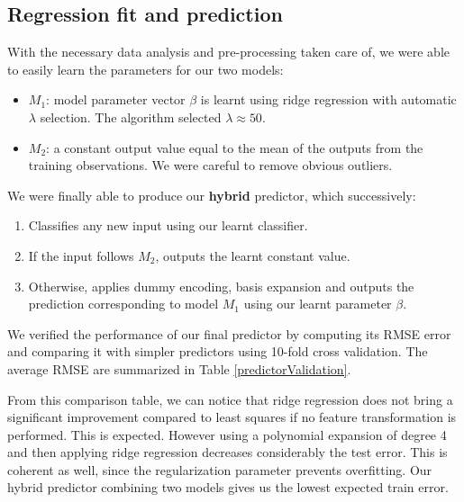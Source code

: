 \documentclass{article} %
\begin{document}
  \subsection{Regression fit and prediction}
  With the necessary data analysis and pre-processing taken care of, we were able to easily learn the parameters for our two models:
  \begin{itemize}
    \item $M_1$: model parameter vector $\beta$ is learnt using ridge regression with automatic $\lambda$ selection. The algorithm selected $\lambda \approx 50$.
    \item $M_2$: a constant output value equal to the mean of the outputs from the training observations. We were careful to remove obvious outliers.
  \end{itemize}

  We were finally able to produce our \textbf{hybrid} predictor, which successively:
  \begin{enumerate}
    \item Classifies any new input using our learnt classifier.
    \item If the input follows $M_2$, outputs the learnt constant value.
    \item Otherwise, applies dummy encoding, basis expansion and outputs the prediction corresponding to model $M_1$ using our learnt parameter $\beta$.
  \end{enumerate}

  We verified the performance of our final predictor by computing its RMSE error and comparing it with simpler predictors using 10-fold cross validation. The average RMSE are summarized in Table \ref{predictorValidation}.

  From this comparison table, we can notice that ridge regression does not bring a significant improvement compared to least squares if no feature transformation is performed. This is expected. However using a polynomial expansion of degree 4 and then applying ridge regression decreases considerably the test error. This is coherent as well, since the regularization parameter prevents overfitting. Our hybrid predictor combining two models gives us the lowest expected train error.
\end{document}
